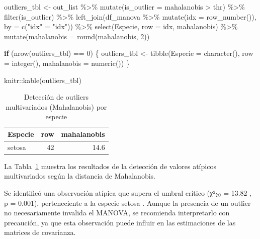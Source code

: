 \documentclass[
  spanish,
  11pt,
  a4paper,
  DIV=11,
  numbers=noendperiod]{scrartcl}
\newenvironment{Shaded}{\begin{snugshade}}{\end{snugshade}}
\newcommand{\AttributeTok}[1]{\textcolor[rgb]{0.40,0.45,0.13}{#1}}
\newcommand{\ControlFlowTok}[1]{\textcolor[rgb]{0.00,0.23,0.31}{\textbf{#1}}}
\newcommand{\DecValTok}[1]{\textcolor[rgb]{0.68,0.00,0.00}{#1}}
\newcommand{\FunctionTok}[1]{\textcolor[rgb]{0.28,0.35,0.67}{#1}}
\newcommand{\NormalTok}[1]{\textcolor[rgb]{0.00,0.23,0.31}{#1}}
\newcommand{\OtherTok}[1]{\textcolor[rgb]{0.00,0.23,0.31}{#1}}
\newcommand{\SpecialCharTok}[1]{\textcolor[rgb]{0.37,0.37,0.37}{#1}}
\newcommand{\StringTok}[1]{\textcolor[rgb]{0.13,0.47,0.30}{#1}}
\begin{document}
\begin{Shaded}
\begin{Highlighting}[numbers=left,,]
\NormalTok{outliers\_tbl }\OtherTok{\textless{}{-}}\NormalTok{ out\_list }\SpecialCharTok{\%\textgreater{}\%}
  \FunctionTok{mutate}\NormalTok{(}\AttributeTok{is\_outlier =}\NormalTok{ mahalanobis }\SpecialCharTok{\textgreater{}}\NormalTok{ thr) }\SpecialCharTok{\%\textgreater{}\%}
  \FunctionTok{filter}\NormalTok{(is\_outlier) }\SpecialCharTok{\%\textgreater{}\%}
  \FunctionTok{left\_join}\NormalTok{(df\_manova }\SpecialCharTok{\%\textgreater{}\%} \FunctionTok{mutate}\NormalTok{(}\AttributeTok{idx =} \FunctionTok{row\_number}\NormalTok{()), }
            \AttributeTok{by =} \FunctionTok{c}\NormalTok{(}\StringTok{"idx"} \OtherTok{=} \StringTok{"idx"}\NormalTok{)) }\SpecialCharTok{\%\textgreater{}\%}
  \FunctionTok{select}\NormalTok{(Especie, }\AttributeTok{row =}\NormalTok{ idx, mahalanobis) }\SpecialCharTok{\%\textgreater{}\%}
  \FunctionTok{mutate}\NormalTok{(}\AttributeTok{mahalanobis =} \FunctionTok{round}\NormalTok{(mahalanobis, }\DecValTok{2}\NormalTok{))}

\ControlFlowTok{if}\NormalTok{ (}\FunctionTok{nrow}\NormalTok{(outliers\_tbl) }\SpecialCharTok{==} \DecValTok{0}\NormalTok{) \{}
\NormalTok{  outliers\_tbl }\OtherTok{\textless{}{-}} \FunctionTok{tibble}\NormalTok{(}\AttributeTok{Especie =} \FunctionTok{character}\NormalTok{(), }\AttributeTok{row =} \FunctionTok{integer}\NormalTok{(), }
                         \AttributeTok{mahalanobis =} \FunctionTok{numeric}\NormalTok{())}
\NormalTok{\}}

\NormalTok{knitr}\SpecialCharTok{::}\FunctionTok{kable}\NormalTok{(outliers\_tbl)}
\end{Highlighting}
\end{Shaded}

\begin{longtable}[]{@{}lrr@{}}

\caption{\label{tbl-manova-outliers}Detección de outliers multivariados
(Mahalanobis) por especie}

\tabularnewline

\toprule\noalign{}
Especie & row & mahalanobis \\
\midrule\noalign{}
\endhead
\bottomrule\noalign{}
\endlastfoot
setosa & 42 & 14.6 \\

\end{longtable}

La Tabla~\ref{tbl-manova-outliers} muestra los resultados de la
detección de valores atípicos multivariados según la distancia de
Mahalanobis.

Se identificó una observación atípica que supera el umbral crítico
(χ²₍₂₎ = 13.82 , p = 0.001), perteneciente a la especie setosa . Aunque
la presencia de un outlier no necesariamente invalida el MANOVA, se
recomienda interpretarlo con precaución, ya que esta observación puede
influir en las estimaciones de las matrices de covarianza.
\end{document}
